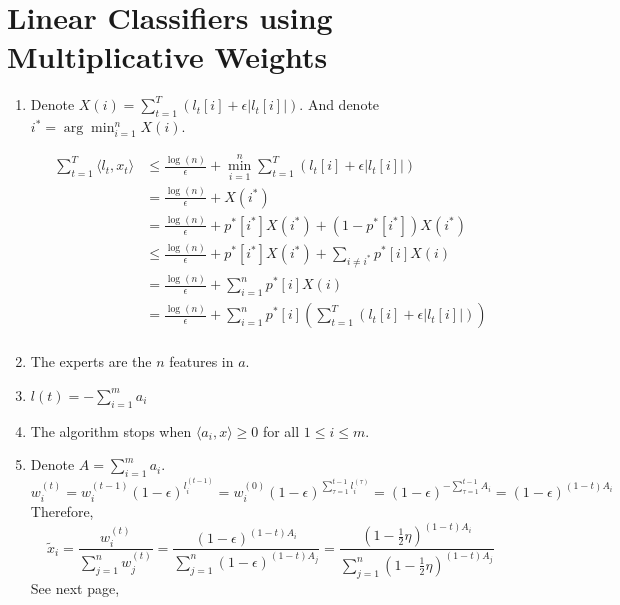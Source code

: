\documentclass[11pt]{article}
\newenvironment{qparts}{\begin{enumerate}[{(}a{)}]}{\end{enumerate}}
\begin{document}
\section{Linear Classifiers using Multiplicative Weights}
\begin{qparts}
	
	\item 

	Denote $X(i) = \sum_{t=1}^T(l_t[i] + \epsilon | l_t[i] | )$. And denote $i^* = \arg\min_{i=1}^n X(i)$.
	
	
	\begin{align*}
		\sum_{t=1}^T \langle l_t,x_t \rangle
		&\le
		\frac{\log(n)}{\epsilon} + \min_{i=1}^n \sum_{t=1}^T(l_t[i] + \epsilon | l_t[i] | ) \\
		&=
		\frac{\log(n)}{\epsilon} + X(i^*) \\
		&=
		\frac{\log(n)}{\epsilon} + p^*[i^*]X(i^*) + (1 - p^*[i^*])X(i^*) \\
		&\le
		\frac{\log(n)}{\epsilon} + p^*[i^*]X(i^*) + \sum_{i\ne i^*} p^*[i]X(i) \\
		&=
		\frac{\log(n)}{\epsilon} + \sum_{i=1}^n p^*[i]X(i) \\
		&=
		\frac{\log(n)}{\epsilon} + \sum_{i=1}^n p^*[i]( \sum_{t=1}^T(l_t[i] + \epsilon | l_t[i] | )) \\
	\end{align*}
	
	\item
	
	The experts are the $n$ features in $a$.
	
	\item
	
	$l(t)=-\sum_{i=1}^{m}a_i$
	
	\item
	
	The algorithm stops when $\langle a_i,x \rangle \ge 0$ for all $1 \le i \le m$.
	
	\item
	
	Denote $A = \sum_{i=1}^m a_i$.
	\[
		w_i^{(t)} 
		= w_i^{(t-1)}(1 - \epsilon)^{l_i^{(t-1)}} 
		= w_i^{(0)}(1 - \epsilon)^{\sum_{\tau=1}^{t-1} l_i^{(\tau)}}
		= (1 - \epsilon)^{-\sum_{\tau=1}^{t-1}A_i}
		= (1 - \epsilon)^{(1-t)A_i}
	\]
	Therefore,
	\[
		\widetilde x_i
		= \frac{w_i^{(t)}}{\sum_{j=1}^{n} w_j^{(t)} }
		= \frac{(1 - \epsilon)^{(1-t)A_i}}{\sum_{j=1}^n(1 - \epsilon)^{(1-t)A_j}}
		= \frac{(1 - \frac{1}{2}\eta)^{(1-t)A_i}}{\sum_{j=1}^n(1 - \frac{1}{2}\eta)^{(1-t)A_j}}
	\]
	See next page,
	

\end{qparts}
\end{document}
